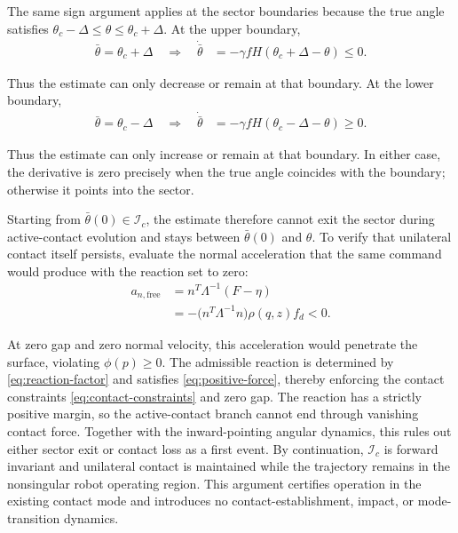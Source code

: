 \documentclass[10pt,journal,letterpaper]{IEEEtran}
\begin{document}
The same sign argument applies at the sector boundaries because the true angle satisfies $\theta_c-\Delta\leq\theta\leq\theta_c+\Delta$. At the upper boundary,
\begin{align*}
\bar\theta=\theta_c+\Delta
\quad\Longrightarrow\quad
\dot{\bar\theta}
&=-\gamma fH(\theta_c+\Delta-\theta)\leq0.
\end{align*}

Thus the estimate can only decrease or remain at that boundary. At the lower boundary,
\begin{align*}
\bar\theta=\theta_c-\Delta
\quad\Longrightarrow\quad
\dot{\bar\theta}
&=-\gamma fH(\theta_c-\Delta-\theta)\geq0.
\end{align*}

Thus the estimate can only increase or remain at that boundary. In either case, the derivative is zero precisely when the true angle coincides with the boundary; otherwise it points into the sector.

Starting from $\bar\theta(0)\in\mathcal I_c$, the estimate therefore cannot exit the sector during active-contact evolution and stays between $\bar\theta(0)$ and $\theta$. To verify that unilateral contact itself persists, evaluate the normal acceleration that the same command would produce with the reaction set to zero:
\begin{equation}\label{eq:free-normal-acceleration}
\begin{aligned}
a_{n,\mathrm{free}}
&=n^T\Lambda^{-1}(F-\eta)\\
&=-\bigl(n^T\Lambda^{-1}n\bigr)\rho(q,z)f_d<0.
\end{aligned}
\end{equation}

At zero gap and zero normal velocity, this acceleration would penetrate the surface, violating $\phi(p)\geq0$. The admissible reaction is determined by \eqref{eq:reaction-factor} and satisfies \eqref{eq:positive-force}, thereby enforcing the contact constraints \eqref{eq:contact-constraints} and zero gap. The reaction has a strictly positive margin, so the active-contact branch cannot end through vanishing contact force. Together with the inward-pointing angular dynamics, this rules out either sector exit or contact loss as a first event. By continuation, $\mathcal I_c$ is forward invariant and unilateral contact is maintained while the trajectory remains in the nonsingular robot operating region. This argument certifies operation in the existing contact mode and introduces no contact-establishment, impact, or mode-transition dynamics.
\end{document}
